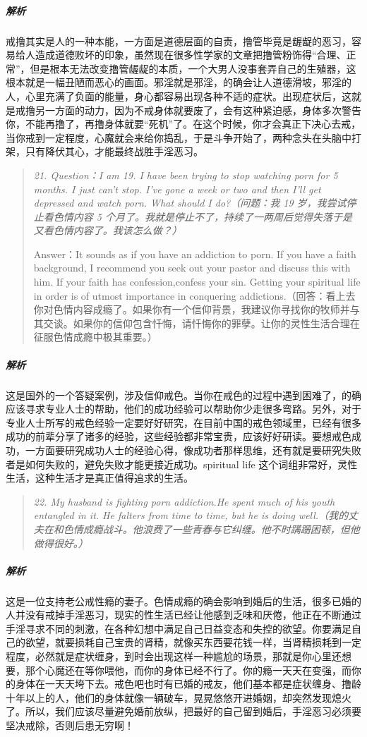 \subparagraph{解析} 戒撸其实是人的一种本能，一方面是道德层面的自责，撸管毕竟是龌龊的恶习，容易给人造成道德败坏的印象，虽然现在很多性学家的文章把撸管粉饰得“合理、正常”，但是根本无法改变撸管龌龊的本质，一个大男人没事套弄自己的生殖器，这根本就是一幅丑陋而恶心的画面。邪淫就是邪淫，的确会让人道德滑坡，邪淫的人，心里充满了负面的能量，身心都容易出现各种不适的症状。出现症状后，这就是戒撸另一方面的动力，因为不戒身体就要废了，会有这种紧迫感，身体多次警告你，不能再撸了，再撸身体就要“死机”了。在这个时候，你才会真正下决心去戒，当你戒到一定程度，心魔就会来给你捣乱，于是斗争开始了，两种念头在头脑中打架，只有降伏其心，才能最终战胜手淫恶习。

\begin{quote}\it
    21. Question：I am 19. I have been trying to stop watching porn for 5 months. I just can't stop. I've gone a week or two and then I'll get depressed and watch porn. What should I do?（问题：我 19 岁，我尝试停止看色情内容 5 个月了。我就是停止不了，持续了一两周后觉得失落于是又看色情内容了。我该怎么做？）

    Answer：It sounds as if you have an addiction to porn. If you have a faith background, I recommend you seek out your pastor and discuss this with him. If your faith has confession,confess your sin. Getting your spiritual life in order is of utmost importance in conquering addictions.（回答：看上去你对色情内容成瘾了。如果你有一个信仰背景，我建议你寻找你的牧师并与其交谈。如果你的信仰包含忏悔，请忏悔你的罪孽。让你的灵性生活合理在征服色情成瘾中极其重要。）
\end{quote}

\subparagraph{解析} 这是国外的一个答疑案例，涉及信仰戒色。当你在戒色的过程中遇到困难了，的确应该寻求专业人士的帮助，他们的成功经验可以帮助你少走很多弯路。另外，对于专业人士所写的戒色经验一定要好好研究，在目前中国的戒色领域里，已经有很多成功的前辈分享了诸多的经验，这些经验都非常宝贵，应该好好研读。要想戒色成功，一方面要研究成功人士的经验心得，像成功者那样思维，还有就是要研究失败者是如何失败的，避免失败才能更接近成功。spiritual life 这个词组非常好，灵性生活，这种生活才是真正值得追求的生活。

\begin{quote}\it
    22. My husband is fighting porn addiction.He spent much of his youth entangled in it. He falters from time to time, but he is doing well.（我的丈夫在和色情成瘾战斗。他浪费了一些青春与它纠缠。他不时蹒跚困顿，但他做得很好。）
\end{quote}

\subparagraph{解析} 这是一位支持老公戒性瘾的妻子。色情成瘾的确会影响到婚后的生活，很多已婚的人并没有戒掉手淫恶习，现实的性生活已经让他感到乏味和厌倦，他正在不断通过手淫寻求不同的刺激，在各种幻想中满足自己日益变态和失控的欲望。你要满足自己的欲望，就要损耗自己宝贵的肾精，就像买东西要花钱一样，当肾精损耗到一定程度，必然就是症状缠身，到时会出现这样一种尴尬的场景，那就是你心里还想要，那个心魔还在等你喂他，而你的身体已经不行了。你的瘾一天天在变强，而你的身体在一天天垮下去。戒色吧也时有已婚的戒友，他们基本都是症状缠身、撸龄十年以上的人，他们的身体就像一辆破车，晃晃悠悠开进婚姻，却突然发现熄火了。所以，我们应该尽量避免婚前放纵，把最好的自己留到婚后，手淫恶习必须要坚决戒除，否则后患无穷啊！

